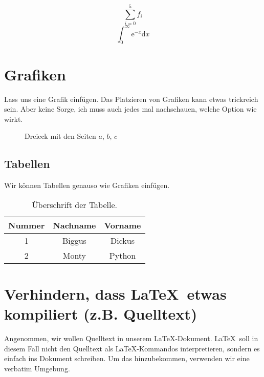 \documentclass[12pt]{article}
\begin{document}
\begin{equation}
  \sum_{i=0}^{5} f_{i}
\end{equation}
\begin{equation}
  \int_{0}^{\infty} \mathrm{e}^{-x} \mathrm{d}x
\end{equation}

\section{Grafiken}

Lass uns eine Grafik einfügen. Das Platzieren von Grafiken kann etwas trickreich sein.
Aber keine Sorge, ich muss auch jedes mal nachschauen, welche Option wie wirkt.

\begin{figure}[H] %
    \centering %
    \caption{Dreieck mit den Seiten $a$, $b$, $c$}
    \label{fig:right-triangle}
\end{figure}

\subsection{Tabellen}
Wir können Tabellen genauso wie Grafiken einfügen.

\begin{table}[H]
  \caption{Überschrift der Tabelle.}
  \begin{tabular}{c|cc}
    Nummer &  Nachname & Vorname \\ %
    \hline %
    1 & Biggus & Dickus \\
    2 & Monty & Python
  \end{tabular}
\end{table}


\section{Verhindern, dass \LaTeX\ etwas kompiliert (z.B. Quelltext)}
Angenommen, wir wollen Quelltext in unserem \LaTeX-Dokument. \LaTeX\ soll
in diesem Fall nicht den Quelltext als \LaTeX-Kommandos interpretieren,
sondern es einfach ins Dokument schreiben. Um das hinzubekommen, verwenden
wir eine verbatim Umgebung.
\end{document}
